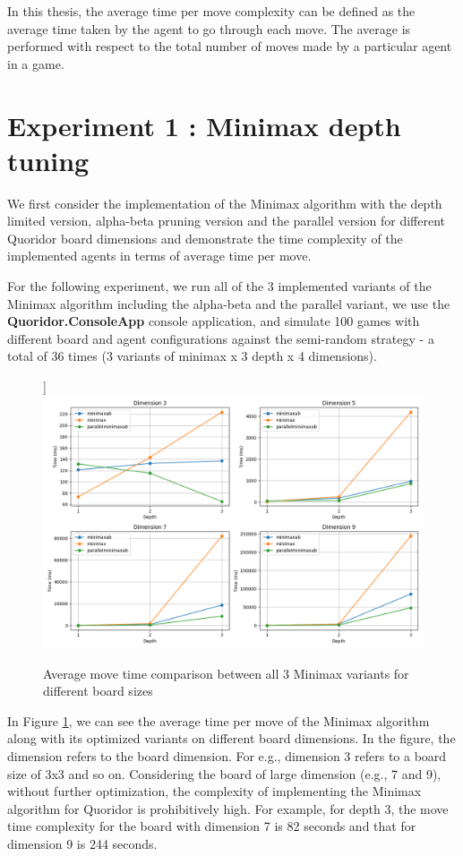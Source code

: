 In this thesis, the average time per move complexity can be defined as the average time taken by the agent to go through each move. The average is performed with respect to the total number of moves made by a particular agent in a game.

\section{Experiment 1 : Minimax depth tuning}

We first consider the implementation of the Minimax algorithm with the depth limited version, alpha-beta pruning version and the parallel version for different Quoridor board dimensions and demonstrate the time complexity of the implemented agents in terms of average time per move. 

For the following experiment, we run all of the 3 implemented variants of the Minimax algorithm including the alpha-beta and the parallel variant, we use the \textbf{Quoridor.ConsoleApp} console application, and simulate 100 games with different board and agent configurations against the semi-random strategy - a total of 36 times (3 variants of minimax x 3 depth x 4 dimensions).

\begin{figure}[!ht]
]
    \centering
    \includegraphics[width=\linewidth]{../img/performance.png}
    \caption{Average move time comparison between all 3 Minimax variants for different board sizes}
    \label{fig:minimax_performance_comp}
\end{figure}

In Figure \ref{fig:minimax_performance_comp}, we can see the average time per move of the Minimax algorithm along with its optimized variants on different board dimensions. In the figure, the dimension refers to the board dimension. For e.g., dimension 3 refers to a board size of 3x3 and so on. Considering the board of large dimension (e.g., 7 and 9), without further optimization, the complexity of implementing the Minimax algorithm for Quoridor is prohibitively high. For example, for depth 3, the move time complexity for the board with dimension 7 is 82 seconds and that for dimension 9 is 244 seconds.

